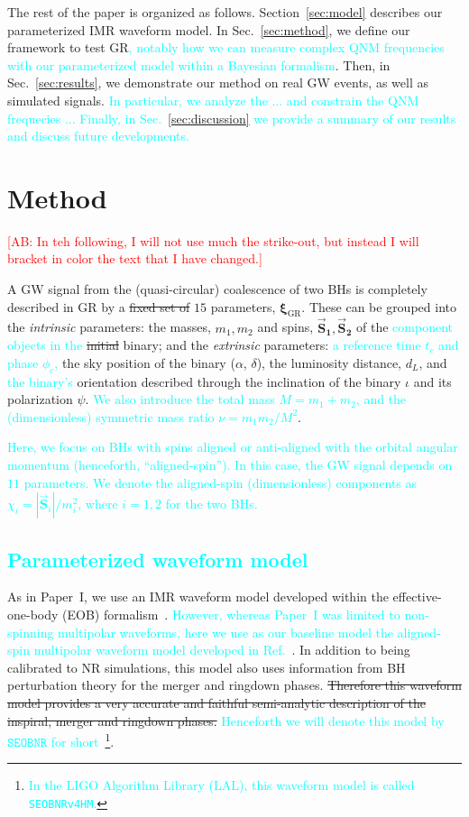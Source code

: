 \documentclass[twocolumn,prd,aps,superscriptaddress,preprintnumbers,tightenlines,showpacs,nofootinbib,eqsecnum,amsfonts,amsmath]{revtex4-1}
\newcommand{\paperone}{Paper~I\xspace}
\newcommand{\ab}[1]{\textcolor{cyan}{#1}}
\newcommand{\comment}[1]{\textcolor{red}{[#1]}}
\newcommand{\bxigr}{\bm{\xi}_{\text{GR}}}
\newcommand{\bs}[1]{\bm{\vec{S}_{#1}}}
\newcommand{\SEOB}{\texttt{SEOBNR}}
\begin{document}
The rest of the paper is organized as follows. Section~\ref{sec:model} describes our parameterized IMR
waveform model. In Sec.~\ref{sec:method}, we define our framework to test GR\ab{, notably how we can measure 
complex QNM frequencies with our parameterized model within a Bayesian formalism}. Then, in Sec.~\ref{sec:results}, 
we demonstrate our method on real GW events, as well as simulated signals. \ab{In particular, we analyze 
the ... and constrain the QNM frequecies ... Finally, in Sec.~\ref{sec:discussion} we provide a summary of
our results and discuss future developments.} 

\section{Method}

\comment{AB: In teh following, I will not use much the strike-out, but instead I will 
bracket in color the text that I have changed.}

A GW signal from the (quasi-circular) coalescence of two BHs is
completely described in GR by a \sout{fixed set of} $15$ parameters,
$\bxigr$. These can be grouped into the \emph{intrinsic} parameters:
the masses, $m_1, m_2$ and spins, $\bs1, \bs2$ of the \ab{component 
objects in the} \sout{initial} binary; and the 
\emph{extrinsic} parameters: \ab{a reference time $t_c$ and phase 
$\phi_c$,} the sky position of the binary ($\alpha$,
$\delta$), the luminosity distance, $d_L$, and \ab{the binary's} orientation
described through the inclination of the binary $\iota$ and its
polarization $\psi$. \ab{We also introduce the total mass $M = m_1+m_2$, 
and the (dimensionless) symmetric mass ratio $\nu = m_1m_2/M^2$}. 

\ab{Here, we focus on BHs with spins aligned or anti-aligned 
with the orbital angular momentum (henceforth, ``aligned-spin''). In this case,  
the GW signal depends on $11$ parameters. We denote the 
aligned-spin \ab{(dimensionless)} components as $\chi_{i} = |\vec{\bm{S}}_i|/m^2_i$, where $i=1,2$ for the two BHs.}

\ab{\subsection{Parameterized waveform model}}\label{sec:model}

As in \paperone, we use an IMR waveform model developed within the effective-one-body (EOB) 
formalism~\cite{}. \ab{However, whereas \paperone was limited to non-spinning multipolar waveforms, 
here we use as our baseline model the aligned-spin multipolar waveform model 
developed in Ref.~\citep{Cotesta:2018fcv}}. In addition to being
calibrated to NR simulations, this model also uses information from BH
perturbation theory for the merger and ringdown phases. \sout{Therefore this
waveform model provides a very accurate and faithful semi-analytic
description of the inspiral, merger and ringdown phases.} \ab{Henceforth we
will denote this model by $\SEOB$ for short}~\footnote{\ab{In the LIGO Algorithm Library (LAL), this 
waveform model is called {\tt SEOBNRv4HM}.}}.
\end{document}
